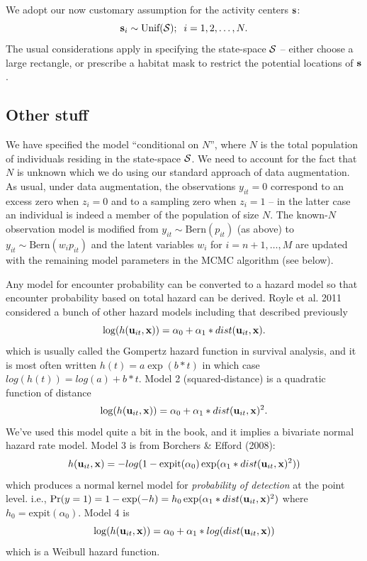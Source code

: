 We adopt our now customary assumption for the activity centers ${\bf s}$:
\[
 {\bf s}_{i} \sim \mbox{Unif}({\cal S}); \; \; i=1,2,\ldots,N.
\]
The usual considerations apply in specifying the state-space ${\cal
  S}$ -- either choose a large rectangle, or prescribe a habitat mask
to restrict the potential locations of ${\bf s}$.




\subsection{Other stuff}

We have specified the model ``conditional on $N$'', where $N$
is the total population of individuals residing in the state-space
${\cal S}$. We need to account for the fact that $N$ is unknown which
we do using our standard approach of data augmentation. 
As usual, under data augmentation, the
observations $y_{it}=0$
correspond to an excess zero when $z_{i}=0$ and to a sampling
zero when $z_{i}=1$ -- in the latter case an
individual is indeed a member of the population of size $N$. The known-$N$ observation model is
modified from $y_{it} \sim \mbox{Bern}(p_{it})$ (as above) to $y_{it}
\sim \mbox{Bern}(w_{i} p_{it})$ and the latent variables $w_{i}$ for
$i=n+1,\ldots,M$ are updated with the remaining model parameters in
the MCMC algorithm (see below). 

Any model for encounter probability can be converted to a hazard model
so that encounter probability based on total hazard can be derived.
Royle et al. 2011 considered a bunch of other hazard models including
that described previously
\[
\log(h({\bf u}_{it},{\bf x})) = \alpha_{0} + \alpha_{1}*dist({\bf u}_{it},{\bf x}).
\]
which is usually called the Gompertz hazard function in survival
analysis, and it is most often written $h(t) = a \exp( b*t)$ in which
case $log(h(t)) = log(a) + b*t$.  Model 2 (squared-distance) is a
quadratic function of distance
\[
\log(h({\bf u}_{it},{\bf x})) = \alpha_{0} + \alpha_{1}*dist({\bf u}_{it},{\bf x})^2.
\]
We've used this model quite a bit in the book, and it implies a
bivariate normal hazard rate model. Model 3 is from Borchers \& Efford
(2008):
\[
h({\bf u}_{it},{\bf x} ) = -log(1 - \mbox{expit}(\alpha_{0})
\exp( \alpha_{1}*dist({\bf u}_{it},{\bf x})^2 ) )
\]
which produces a normal kernel model for {\it probability of
  detection} at the point level. i.e., $\Pr(y=1) = 1-\exp(-h) = h_{0}
\exp( \alpha_{1}*dist({\bf u}_{it},{\bf x})^2 )$ where $h_{0} =
\mbox{expit}(\alpha_{0})$.  Model 4 is
\[
\log(h({\bf u}_{it},{\bf x})) = \alpha_{0} + \alpha_{1}*log(dist({\bf u}_{it},{\bf x}))
\]
which is a Weibull hazard function.



